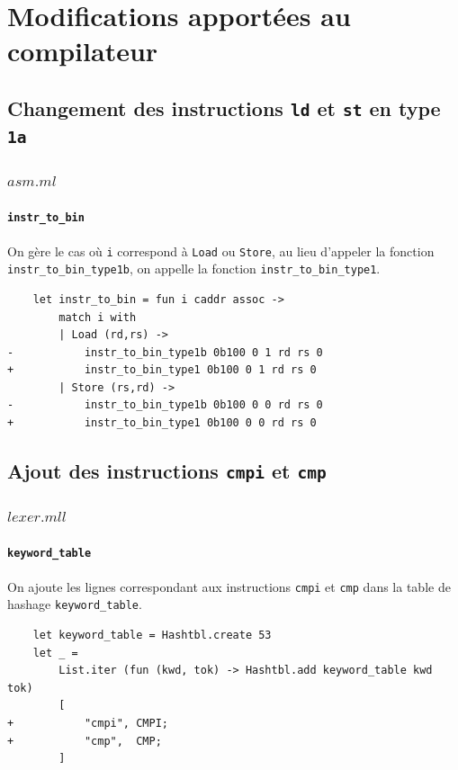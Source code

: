 \documentclass[11pt, a4paper, twoside, titlepage]{article}
\begin{document}
\section{Modifications apportées au compilateur}

\subsection{Changement des instructions \texttt{ld} et \texttt{st} en type \texttt{1a}}

\subsubsection{$asm.ml$}
\paragraph{\texttt{instr\_to\_bin}}
On gère le cas où \texttt{i} correspond à \texttt{Load} ou \texttt{Store}, au lieu d'appeler la fonction \texttt{instr\_to\_bin\_type1b}, on appelle la fonction \texttt{instr\_to\_bin\_type1}.
\begin{lstlisting}
	let instr_to_bin = fun i caddr assoc ->
		match i with
		| Load (rd,rs) ->
-			instr_to_bin_type1b 0b100 0 1 rd rs 0
+			instr_to_bin_type1 0b100 0 1 rd rs 0
		| Store (rs,rd) ->
-			instr_to_bin_type1b 0b100 0 0 rd rs 0
+			instr_to_bin_type1 0b100 0 0 rd rs 0
\end{lstlisting}

\subsection{Ajout des instructions \texttt{cmpi} et \texttt{cmp}}

\subsubsection{$lexer.mll$}
\paragraph{\texttt{keyword\_table}}
On ajoute les lignes correspondant aux instructions \texttt{cmpi} et \texttt{cmp} dans la table de hashage \texttt{keyword\_table}.
\begin{lstlisting}
	let keyword_table = Hashtbl.create 53
	let _ =
		List.iter (fun (kwd, tok) -> Hashtbl.add keyword_table kwd tok)
		[
+			"cmpi", CMPI;
+			"cmp",  CMP;
		]
\end{lstlisting}
\end{document}
